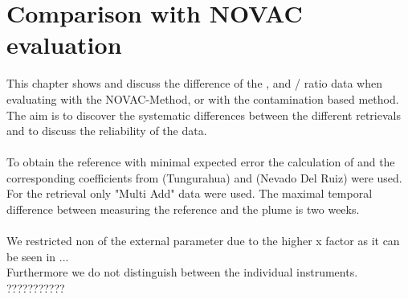 \documentclass  [
  paper    = a4,
  BCOR     = 10mm,
  twoside,
  fontsize = 12pt,
  fleqn,
  toc      = bibnumbered,
  toc      = listofnumbered,
  numbers  = noendperiod,
  headings = normal,
  listof   = leveldown,
  version  = 3.03
]                                       {scrreprt}
\begin{document}
	\chapter{Comparison with NOVAC evaluation}
	This chapter shows and discuss the difference of the ,   and /  ratio data when evaluating with the NOVAC-Method, or with the contamination based method.
	The aim is to discover the systematic differences between the different retrievals and to discuss the reliability of the data.\\
	\\
	To obtain the reference with minimal expected    error the calculation of  and the corresponding coefficients from  (Tungurahua) and  (Nevado Del Ruiz) were used. 
	For the retrieval only "Multi Add" data were used. The maximal temporal difference between measuring the reference and the plume is two weeks.\\
	\\
	We restricted non of the external parameter due to the higher x factor as it can be seen in ...\\
	Furthermore we do not distinguish between the individual instruments. ???????????\\
\end{document}
